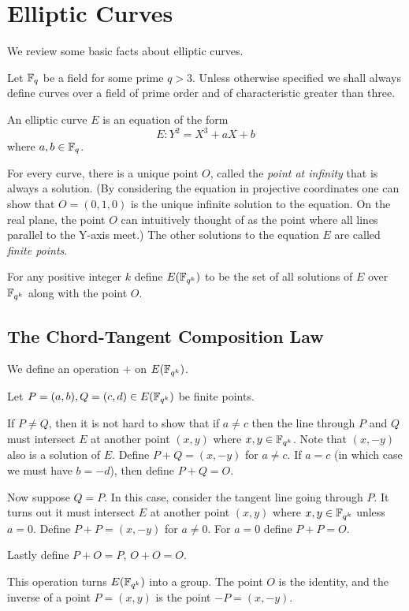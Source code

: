 \chapter {Elliptic Curves}
We review some basic facts about elliptic curves.

Let $\mathbb{F}_q$ be a field for some prime $q > 3$.
Unless otherwise specified we shall always
define curves over a field of prime order and of characteristic greater
than three.

An elliptic curve $E$ is an equation of the form
\[ E: Y^2 = X^3 + a X + b \]
where $a, b \in \mathbb{F}_q$.

For every curve, there is a unique point $O$,
called the \emph{point at infinity}
that is always a solution. (By considering the equation in
projective coordinates one can show that $O = (0,1,0)$ is the unique
infinite solution to the equation. On the real plane,
the point $O$ can intuitively thought of as the point where all lines
parallel to the Y-axis meet.) The other solutions to the equation $E$
are called \emph{finite points}.

For any positive integer $k$ define $E(\mathbb{F}_{q^k})$ to be the set of all solutions
of $E$ over $\mathbb{F}_{q^k}$ along with the point $O$.

\section {The Chord-Tangent Composition Law}

We define an operation $+$ on $E(\mathbb{F}_{q^k})$.

Let $P = (a,b), Q = (c,d) \in E(\mathbb{F}_{q^k})$ be finite points.

If $P \ne Q$, then it is not hard to show that if $a \ne c$
then the line through $P$ and $Q$ must intersect $E$ at another point
$(x,y)$ where $x, y\in \mathbb{F}_{q^k}$. Note that $(x,-y)$ also is a solution of $E$.
Define $P + Q = (x, -y)$ for $a \ne c$.
If $a = c$ (in which case we must have $b = -d$),
then define $P + Q = O$.

Now suppose $Q = P$. In this case, consider the tangent line going through
$P$. It turns out it must intersect $E$ at another point $(x,y)$ where
$x,y\in\mathbb{F}_{q^k}$ unless $a = 0$. Define $P + P = (x, -y)$ for $a \ne 0$.
For $a = 0$ define $P + P = O$.

Lastly define $P + O = P$, $O + O = O$.

This operation turns $E(\mathbb{F}_{q^k})$ into a group.
The point $O$ is the identity, and the inverse
of a point $P = (x,y)$ is the point $-P = (x,-y)$.

